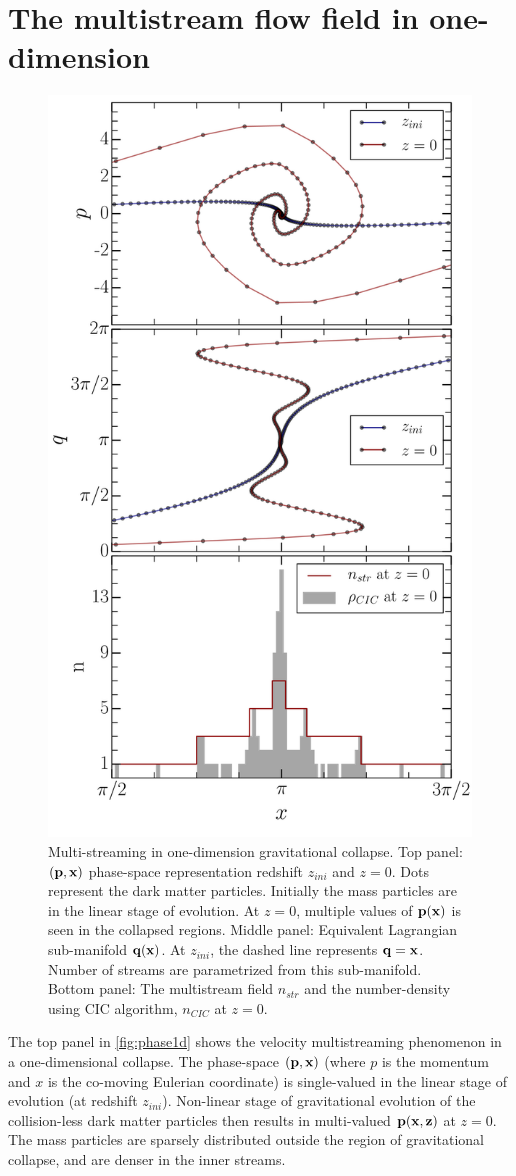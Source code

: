 \chapter{The multistream flow field in one-dimension}
\label{appendix:nstream}

\begin{figure}
\begin{minipage}[t]{.99\linewidth}
  \centering\includegraphics[width=8.cm]{Chapter4/Source_v2/fig13.pdf} 
\end{minipage}\hfill
\caption{ Multi-streaming in one-dimension gravitational collapse. Top panel: $(\bf{p}, \bf{x})$ phase-space representation redshift $z_{ini}$ and $z = 0$. Dots represent the dark matter particles. Initially the mass particles are in the linear stage of evolution. At $z = 0$, multiple values of $\bf{p}(\bf{x})$ is seen in the collapsed regions. Middle panel: Equivalent Lagrangian sub-manifold $\bf{q}(\bf{x})$. At $z_{ini}$, the dashed line represents $\bf{q} = \bf{x}$. Number of streams are parametrized from this sub-manifold. Bottom panel: The multistream field $n_{str}$ and the number-density using CIC algorithm, $n_{CIC}$ at $z = 0$. }
\label{fig:phase1d}
\end{figure}

The top panel in \autoref{fig:phase1d} shows the velocity multistreaming phenomenon in a one-dimensional collapse. The phase-space $(\bf{p}, \bf{x})$ (where $p$ is the momentum and $x$ is the co-moving Eulerian coordinate) is single-valued in the linear stage of evolution (at redshift $z_{ini}$). Non-linear stage of gravitational evolution of the collision-less dark matter particles then results in multi-valued $\bf{p} (\bf{x},z)$ at $z = 0$. The mass particles are sparsely  distributed outside the region of gravitational collapse, and are denser in the inner streams.

